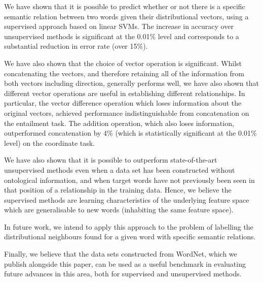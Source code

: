 \documentclass[11pt]{article}
\begin{document}
We have shown that it is possible to predict whether
or not there is a specific semantic relation between two words given
their distributional vectors, using a supervised approach based on linear SVMs. The   increase in accuracy over unsupervised methods is significant at the 0.01\% level and corresponds to a substantial reduction in error rate (over 15\%).

We have also shown that the choice of vector operation is significant.  Whilst concatenating the vectors, and therefore retaining all of the information from both vectors including direction, generally performs well, we have also shown that different vector operations are useful in establishing different relationships.  In particular, the vector difference operation which loses information about the original vectors, achieved performance indistinguishable from concatenation on the entailment task.  The addition operation, which also loses information, outperformed concatenation by 4\% (which is statistically significant at the 0.01\% level) on the coordinate task.

We have also shown that it is possible to outperform  state-of-the-art unsupervised methods even when a data set has been constructed without  ontological information, and when target words have not previously been seen in that position of a relationship in the training data.  Hence, we believe the supervised methods are learning characteristics of the underlying feature space which are generalisable to new words (inhabiting the same feature space).  

In future work, we intend to apply this approach to the problem of labelling the distributional neighbours found for a given word
 with specific semantic relations.

Finally, we believe that the data sets constructed from WordNet, which we publish alongside this paper,  can be used as a useful benchmark in evaluating future advances in this area, both for supervised and unsupervised methods.

\newpage



\end{document}
